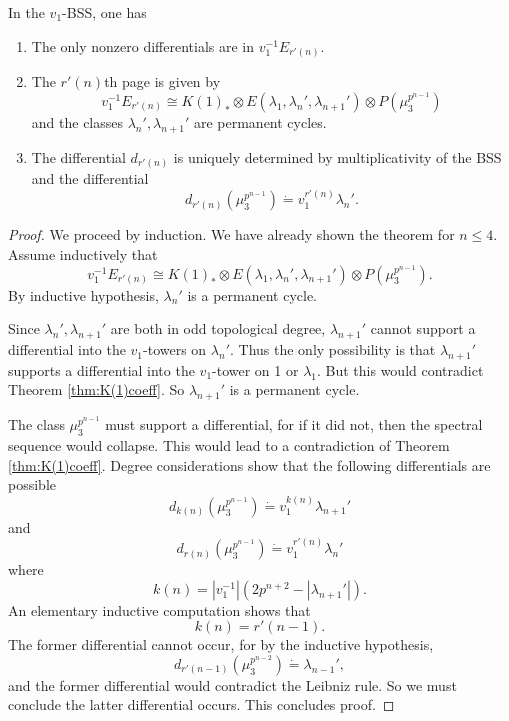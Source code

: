 \begin{thm}
	In the $v_1$-BSS, one has 
	\begin{enumerate}
		\item The only nonzero differentials are in $v_1^{-1}E_{r'(n)}$. 
		\item The $r'(n)$th page is given by 
		\[
		v_1^{-1}E_{r'(n)} \cong K(1)_*\otimes E(\lambda_1, \lambda_n', \lambda_{n+1}')\otimes P(\mu_3^{p^{n-1}})
		\]
		and the classes $\lambda_{n}', \lambda_{n+1}'$ are permanent cycles. 
		\item The differential $d_{r'(n)}$ is uniquely determined by multiplicativity of the BSS and the differential
		\[
		d_{r'(n)}(\mu_3^{p^{n-1}})\dot{=}v_1^{r'(n)}\lambda_n'.
		\]
	\end{enumerate}
\end{thm}
\begin{proof}
	We proceed by induction. We have already shown the theorem for $n\leq 4$. Assume inductively that 
	\[
	v_1^{-1}E_{r'(n)}\cong K(1)_*\otimes E(\lambda_1, \lambda_n', \lambda_{n+1}')\otimes P(\mu_3^{p^{n-1}}).
	\]
	By inductive hypothesis, $\lambda_n'$ is a permanent cycle.  
	
	Since $\lambda_n', \lambda_{n+1}'$ are both in odd topological degree, $\lambda_{n+1}'$ cannot support a differential into the $v_1$-towers on $\lambda_n'$. Thus the only possibility is that $\lambda_{n+1}'$ supports a differential into the $v_1$-tower on 1 or $\lambda_1$. But this would contradict Theorem \ref{thm:K(1)coeff}. So $\lambda_{n+1}'$ is a permanent cycle. 
	
	The class $\mu_3^{p^{n-1}}$ must support a differential, for if it did not, then the spectral sequence would collapse. This would lead to a contradiction of Theorem \ref{thm:K(1)coeff}. Degree considerations show that the following differentials are possible
	\[
	d_{k(n)}(\mu_3^{p^{n-1}})\dot{=}v_1^{k(n)}\lambda_{n+1}'
	\]
	and 
	\[
	d_{r(n)}(\mu_3^{p^{n-1}})\dot{=}v_1^{r'(n)}\lambda_{n}'
	\]
	where
	\[
	k(n) = |v_1^{-1}|(2p^{n+2}-|\lambda_{n+1}'|).
	\]
	An elementary inductive computation shows that 
	\[
	k(n) = r'(n-1).
	\]
	The former differential cannot occur, for by the inductive hypothesis, 
	\[
	d_{r'(n-1)} (\mu_3^{p^{n-2}})\dot{=}\lambda_{n-1}', 
	\]
	and the former differential would contradict the Leibniz rule. So we must conclude the latter differential occurs. This concludes proof.
\end{proof}

